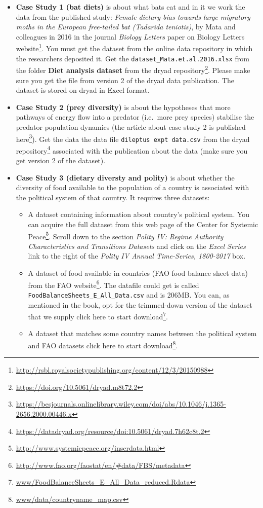 \documentclass[]{book}
\providecommand{\tightlist}{%
  \setlength{\itemsep}{0pt}\setlength{\parskip}{0pt}}
\renewcommand{\href}[2]{#2\footnote{\url{#1}}}
\begin{document}
\begin{itemize}
\item
  \textbf{Case Study 1 (bat diets)} is about what bats eat and in it we work the data from the published study: \emph{Female dietary bias towards large migratory moths in the European free-tailed bat (Tadarida teniotis)}, by Mata and colleagues in 2016 in the journal \emph{Biology Letters} \href{http://rsbl.royalsocietypublishing.org/content/12/3/20150988}{paper on Biology Letters website}. You must get the dataset from the online data repository in which the researchers deposited it. Get the \texttt{dataset\_Mata.et.al.2016.xlsx} from the folder \textbf{Diet analysis dataset} from the \href{https://doi.org/10.5061/dryad.m8t72.2}{dryad repository}. Please make sure you get the file from version 2 of the dryad data publication. The dataset is stored on dryad in Excel format.
\item
  \textbf{Case Study 2 (prey diversity)} is about the hypotheses that more pathways of energy flow into a predator (i.e.~more prey species) stabilise the predator population dynamics (\href{https://besjournals.onlinelibrary.wiley.com/doi/abs/10.1046/j.1365-2656.2000.00446.x}{the article about case study 2 is published here}). Get the data the data file \texttt{dileptus\ expt\ data.csv} from the \href{https://datadryad.org/resource/doi:10.5061/dryad.7h62c8t.2}{dryad repository} associated with the publication about the data (make sure you get version 2 of the dataset).
\item
  \textbf{Case Study 3 (dietary diversty and polity)} is about whether the diversity of food available to the population of a country is associated with the political system of that country. It requires three datasets:

  \begin{itemize}
  \tightlist
  \item
    A dataset containing information about country's political system. You can acquire the full dataset from \href{http://www.systemicpeace.org/inscrdata.html}{this web page of the Center for Systemic Peace}. Scroll down to the section \emph{Polity IV: Regime Authority Characteristics and Transitions Datasets} and click on the \emph{Excel Series} link to the right of the \emph{Polity IV Annual Time-Series, 1800-2017} box.
  \item
    A dataset of food available in countries (FAO food balance sheet data) from the \href{http://www.fao.org/faostat/en/\#data/FBS/metadata}{FAO website}. The datafile could get is called \texttt{FoodBalanceSheets\_E\_All\_Data.csv} and is 206MB. You can, as mentioned in the book, opt for the trimmed-down version of the dataset that we supply \href{www/FoodBalanceSheets_E_All_Data_reduced.Rdata}{click here to start download}.
  \item
    A dataset that matches some country names between the political system and FAO datasets \href{www/data/countryname_map.csv}{click here to start download}.
  \end{itemize}
\end{itemize}
\end{document}
